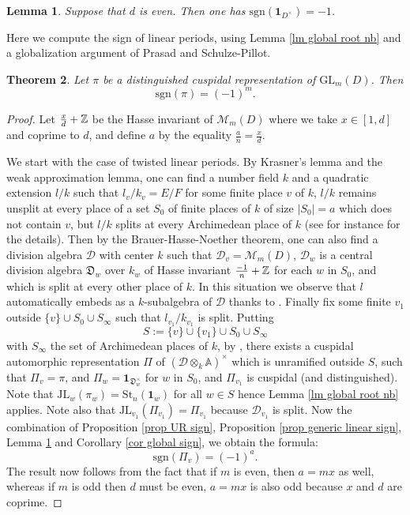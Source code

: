 \documentclass[11pt,letterpaper]{amsart}
\newcommand{\BA}{{\mathbb {A}}} \newcommand{\BB}{{\mathbb {B}}}\newcommand{\BC}{{\mathbb {C}}} \newcommand{\BD}{{\mathbb {D}}}
\renewcommand{\CD}{{\mathcal {D}}}
\newcommand{\CM}{{\mathcal {M}}} \newcommand{\CN}{{\mathcal {N}}}\newcommand{\CO}{{\mathcal {O}}}\newcommand{\CP}{{\mathcal {P}}}
\newcommand{\GL}{{\mathrm {GL}}} \newcommand{\PGL}{{\mathrm {PGL}}}
\newcommand{\triv}{{\mathbf{1}}}
\newcommand{\JL}{{\mathrm{JL}}}
\def\1{\mathbf{1}}
\def\St{\mathrm{St}}
\theoremstyle{plain}
\newtheorem{thm}{Theorem}[section] \newtheorem{cor}[thm]{Corollary}
\newtheorem{lem}[thm]{Lemma}  \newtheorem{prop}[thm]{Proposition}
\numberwithin{equation}{section}
\newcommand{\sg}{\mathrm{sgn}}
\begin{document}
\begin{lem}\label{lm trivial sign}
Suppose that $d$ is even. Then one has $\sg(\1_{D^\times})= -1 $.
\end{lem}

Here we compute the sign of linear periods, using Lemma \ref{lm global root nb} and a globalization argument of Prasad and Schulze-Pillot. 

\begin{thm}\label{thm cusp}
Let $\pi$ be a distinguished cuspidal representation of $\GL_m(D)$. Then \[\sg(\pi)=(-1)^m.\] 
\end{thm}
\begin{proof}
Let $\frac{x}{d}+{\mathbb {Z}}$ be the Hasse invariant of $\CM_m(D)$ where we take $x\in [1,d]$ and coprime to $d$, and define $a$ by the equality 
$\frac{a}{n}=\frac{x}{d}$. 

We start with the case of twisted linear periods. By Krasner's lemma and the weak approximation lemma, one can find a number field $k$ and a quadratic extension $l/k$ such that $l_v/k_v=E/F$ for some finite place $v$ of $k$, $l/k$ remains unsplit at every place of a set $S_0$ of finite places of $k$ of size $|S_0|=a$ which does not contain $v$, but $l/k$ splits at every Archimedean place of $k$ (see for instance \cite[Section 9.6]{AKMSS} for the details). Then by the Brauer-Hasse-Noether theorem, one can also find a division algebra $\CD$ with center $k$ such that $\CD_v=\CM_m(D)$, $\CD_{w}$ is a central division algebra $\mathfrak{D}_w$ over $k_w$ of Hasse invariant $\frac{-1}{n}+{\mathbb {Z}}$ for each $w$ in $S_0$, and which is split at every other place of $k$. In this situation we observe that $l$ automatically embeds as a $k$-subalgebra of $\CD$ thanks to \cite[Theorem 1.1]{SYY}. Finally fix some finite $v_1$ outside $\{v\} \cup S_0\cup S_\infty$ such that $l_{v_1}/k_{v_1}$ is split. Putting  
\[S:=\{v\} \cup 
\{v_1\}\cup S_0\cup S_\infty\] with $S_\infty$ the set of Archimedean places of $k$, by \cite[Theorem 4.1]{PSP}, there exists a cuspidal automorphic representation $\Pi$ of $(\CD\otimes_k \BA)^{\times}$ which is unramified outside $S$, such that $\Pi_v=\pi$, and $\Pi_w=\triv_{\mathfrak{D}_w^\times}$ for $w$ in $S_0$, and $\Pi_{v_1}$ is cuspidal (and distinguished). Note that $\JL_w(\pi_w)=\St_n(\triv_w)$ for all $w\in S$ hence Lemma \ref{lm global root nb} applies. Note also that $\JL_{v_1}(\Pi_{v_1})=\Pi_{v_1}$ because $\CD_{v_1}$ is split. Now the combination of Proposition \ref{prop UR sign}, Proposition \ref{prop generic linear sign}, Lemma \ref{lm trivial sign} and Corollary \ref{cor global sign}, we obtain the formula:
\[\sg(\Pi_v)=(-1)^{a}.\] The result now follows from the fact that if $m$ is even, then $a=mx$ as well, whereas if $m$ is odd then $d$ must be even, $a=mx$ is also odd because $x$ and $d$ are coprime.


\end{proof}
\end{document}
